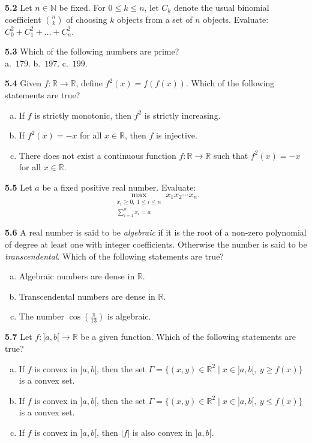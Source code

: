 \documentclass[11pt,a4paper]{article}
\newcommand{\N}{\mathbb{N}}
\newcommand{\R}{\mathbb{R}}
\newcommand{\qitem}[1]{\par\medskip\noindent\textbf{#1}\hspace{0.5em}}
\begin{document}
\qitem{5.2} Let $n \in \N$ be fixed. For $0 \le k \le n$, let $C_k$ denote the usual binomial coefficient $\binom{n}{k}$ of choosing $k$ objects from a set of $n$ objects. Evaluate: $C_0^2 + C_1^2 + \dots + C_n^2$.

\qitem{5.3} Which of the following numbers are prime?\\
a.\ $179$. \qquad b.\ $197$. \qquad c.\ $199$.

\qitem{5.4} Given $f : \R \to \R$, define $f^2(x) = f(f(x))$. Which of the following statements are true?
\begin{enumerate}[a.]
  \item If $f$ is strictly monotonic, then $f^2$ is strictly increasing.
  \item If $f^2(x) = -x$ for all $x \in \R$, then $f$ is injective.
  \item There does not exist a continuous function $f : \R \to \R$ such that $f^2(x) = -x$ for all $x \in \R$.
\end{enumerate}

\qitem{5.5} Let $a$ be a fixed positive real number. Evaluate:
\[
  \max_{\substack{x_i \ge 0,\ 1 \le i \le n \\ \sum_{i=1}^{n} x_i = a}} x_1 x_2 \cdots x_n.
\]

\qitem{5.6} A real number is said to be \emph{algebraic} if it is the root of a non-zero polynomial of degree at least one with integer coefficients. Otherwise the number is said to be \emph{transcendental}. Which of the following statements are true?
\begin{enumerate}[a.]
  \item Algebraic numbers are dense in $\R$.
  \item Transcendental numbers are dense in $\R$.
  \item The number $\cos\left(\frac{\pi}{13}\right)$ is algebraic.
\end{enumerate}

\qitem{5.7} Let $f : ]a, b[ \to \R$ be a given function. Which of the following statements are true?
\begin{enumerate}[a.]
  \item If $f$ is convex in $]a, b[$, then the set $\Gamma = \{(x, y) \in \R^2 \mid x \in ]a, b[,\ y \ge f(x)\}$ is a convex set.
  \item If $f$ is convex in $]a, b[$, then the set $\Gamma = \{(x, y) \in \R^2 \mid x \in ]a, b[,\ y \le f(x)\}$ is a convex set.
  \item If $f$ is convex in $]a, b[$, then $|f|$ is also convex in $]a, b[$.
\end{enumerate}
\end{document}
